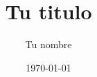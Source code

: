 \documentclass[12pt]{article}
\title{Tu titulo}					%
\author{Tu nombre}					%
\date{\today}						%
\begin{document}
\tableofcontents
\pagebreak







\end{document}
